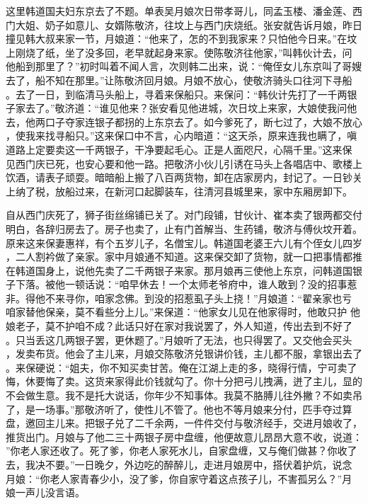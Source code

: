 这里韩道国夫妇东京去了不题。单表吴月娘次日带孝哥儿，同孟玉楼、潘金莲、西
门大姐、奶子如意儿、女婿陈敬济，往坟上与西门庆烧纸。张安就告诉月娘，昨日
撞见韩大叔来家一节，月娘道：“他来了，怎的不到我家来？只怕他今日来。”在坟
上刚烧了纸，坐了没多回，老早就起身来家。使陈敬济往他家，”叫韩伙计去，问
他船到那里了？”初时叫着不闻人言，次则韩二出来，说：“俺侄女儿东京叫了哥嫂
去了，船不知在那里。”让陈敬济回月娘。月娘不放心，使敬济骑头口往河下寻船
。去了一日，到临清马头船上，寻着来保船只。来保问：“韩伙计先打了一千两银
子家去了。”敬济道：“谁见他来？张安看见他进城，次日坟上来家，大娘使我问他
去，他两口子夺家连银子都拐的上东京去了。如今爹死了，断七过了，大娘不放心
，使我来找寻船只。”这来保口中不言，心内暗道：“这天杀，原来连我也瞒了，嗔
道路上定要卖这一千两银子，干净要起毛心。正是人面咫尺，心隔千里。”这来保
见西门庆已死，也安心要和他一路。把敬济小伙儿引诱在马头上各唱店中、歌楼上
饮酒，请表子顽耍。暗暗船上搬了八百两货物，卸在店家房内，封记了。一日钞关
上纳了税，放船过来，在新河口起脚装车，往清河县城里来，家中东厢房卸下。

自从西门庆死了，狮子街丝绵铺已关了。对门段铺，甘伙计、崔本卖了银两都交付
明白，各辞归房去了。房子也卖了，止有门首解当、生药铺，敬济与傅伙坟开着。
原来这来保妻惠祥，有个五岁儿子，名僧宝儿。韩道国老婆王六儿有个侄女儿四岁
，二人割衿做了亲家。家中月娘通不知道。这来保交卸了货物，就一口把事情都推
在韩道国身上，说他先卖了二千两银子来家。那月娘再三使他上东京，问韩道国银
子下落。被他一顿话说：“咱早休去！一个太师老爷府中，谁人敢到？没的招事惹
非。得他不来寻你，咱家念佛。到没的招惹虱子头上挠！”月娘道：“翟亲家也亏
咱家替他保亲，莫不看些分上儿。”来保道：“他家女儿见在他家得时，他敢只护
他娘老子，莫不护咱不成？此话只好在家对我说罢了，外人知道，传出去到不好了
。只当丢这几两银子罢，更休题了。”月娘听了无法，也只得罢了。又交他会买头
，发卖布货。他会了主儿来，月娘交陈敬济兑银讲价钱，主儿都不服，拿银出去了
。来保硬说：“姐夫，你不知买卖甘苦。俺在江湖上走的多，晓得行情，宁可卖了
悔，休要悔了卖。这货来家得此价钱就勾了。你十分把弓儿拽满，迸了主儿，显的
不会做生意。我不是托大说话，你年少不知事体。我莫不胳膊儿往外撇？不如卖吊
了，是一场事。”那敬济听了，使性儿不管了。他也不等月娘来分付，匹手夺过算
盘，邀回主儿来。把银子兑了二千余两，一件件交付与敬济经手，交进月娘收了，
推货出门。月娘与了他二三十两银子房中盘缠，他便故意儿昂昂大意不收，说道：
”你老人家还收了。死了爹，你老人家死水儿，自家盘缠，又与俺们做甚？你收了
去，我决不要。”一日晚夕，外边吃的醉醉儿，走进月娘房中，搭伏着护炕，说念
月娘：“你老人家青春少小，没了爹，你自家守着这点孩子儿，不害孤另么？”月
娘一声儿没言语。

